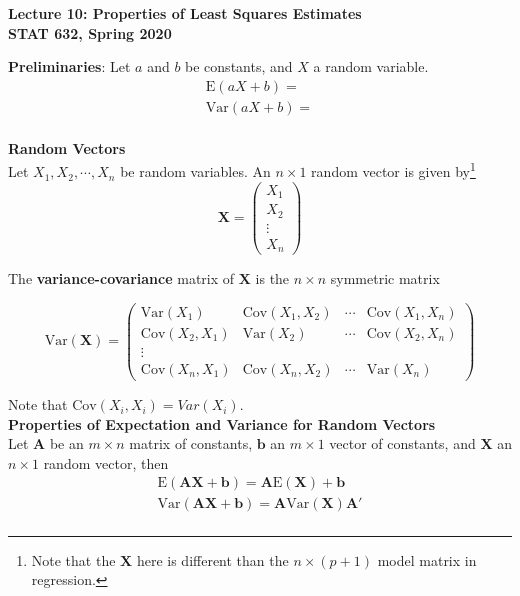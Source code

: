 \documentclass[11pt, fleqn]{article}\usepackage[]{graphicx}\usepackage[]{color}
\newcommand{\Var}{\textrm{Var}}
\newcommand{\Cov}{\textrm{Cov}}
\newcommand{\E}{\textrm{E}}
\begin{document}
\setlength\parindent{0pt}

\begin{center}
\textbf{Lecture 10: Properties of Least Squares Estimates}\\
\textbf{STAT 632, Spring 2020}\\
\hrulefill
\end{center}

\textbf{Preliminaries}: Let $a$ and $b$ be constants, and $X$ a random variable.   
\begin{align*}
\E(aX + b) = \\
\Var(aX + b) = \\
\end{align*}

\textbf{Random Vectors}\\
Let $X_1, X_2, \cdots, X_n$ be random variables.  An $n \times 1$ random vector is given by\footnote{Note that the $\bm{X}$ here is different than the $n \times (p+1)$ model matrix in regression.}
\[
\bm{X} = 
\begin{pmatrix}
X_1 \\
X_2 \\
\vdots\\
X_n
\end{pmatrix}
\]

The \textbf{variance-covariance} matrix of $\bm{X}$ is the $n \times n$ symmetric matrix

\[
\Var(\bm{X}) =
\begin{pmatrix}
\Var(X_1) & \Cov(X_1, X_2) & \cdots & \Cov(X_1, X_n)\\
\Cov(X_2, X_1) & \Var(X_2) & \cdots & \Cov(X_2,X_n)\\
\vdots\\ 
\Cov(X_n, X_1) & \Cov(X_n, X_2) &  \cdots & \Var(X_n)
\end{pmatrix}
\]

Note that $\Cov(X_i, X_i) = Var(X_i)$.\\

\textbf{Properties of Expectation and Variance for Random Vectors}\\
Let $\bm{A}$ be an $m \times n$ matrix of constants, $\bm{b}$ an $m \times 1$ vector of constants, and $\bm{X}$ an $n \times 1$ random vector, then
\begin{align*}
\E(\bm{AX} + \bm{b}) = \bm{A} \E(\bm{X}) + \bm{b}\\
\Var(\bm{AX} + \bm{b}) = \bm{A} \Var(\bm{X}) \bm{A'}\\
\end{align*}
\clearpage
\end{document}
